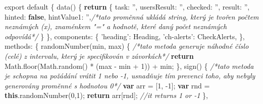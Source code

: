 \documentclass[
]{article}
\newenvironment{Shaded}{}{}
\newcommand{\AttributeTok}[1]{\textcolor[rgb]{0.49,0.56,0.16}{#1}}
\newcommand{\CommentTok}[1]{\textcolor[rgb]{0.38,0.63,0.69}{\textit{#1}}}
\newcommand{\ControlFlowTok}[1]{\textcolor[rgb]{0.00,0.44,0.13}{\textbf{#1}}}
\newcommand{\DataTypeTok}[1]{\textcolor[rgb]{0.56,0.13,0.00}{#1}}
\newcommand{\DecValTok}[1]{\textcolor[rgb]{0.25,0.63,0.44}{#1}}
\newcommand{\ImportTok}[1]{#1}
\newcommand{\KeywordTok}[1]{\textcolor[rgb]{0.00,0.44,0.13}{\textbf{#1}}}
\newcommand{\NormalTok}[1]{#1}
\newcommand{\OperatorTok}[1]{\textcolor[rgb]{0.40,0.40,0.40}{#1}}
\newcommand{\StringTok}[1]{\textcolor[rgb]{0.25,0.44,0.63}{#1}}
\newcommand{\VariableTok}[1]{\textcolor[rgb]{0.10,0.09,0.49}{#1}}
\begin{document}
\begin{Shaded}
\begin{Highlighting}[]
    \ImportTok{export} \ImportTok{default} \OperatorTok{\{}
        \AttributeTok{data}\NormalTok{() }\OperatorTok{\{}
            \ControlFlowTok{return} \OperatorTok{\{}
                \DataTypeTok{task}\OperatorTok{:} \StringTok{''}\OperatorTok{,}
                \DataTypeTok{usersResult}\OperatorTok{:} \StringTok{''}\OperatorTok{,}
                \DataTypeTok{checked}\OperatorTok{:} \StringTok{''}\OperatorTok{,}
                \DataTypeTok{result}\OperatorTok{:} \StringTok{''}\OperatorTok{,}
                \DataTypeTok{hinted}\OperatorTok{:} \KeywordTok{false}\OperatorTok{,}
                \DataTypeTok{hintValue1}\OperatorTok{:} \StringTok{''}\OperatorTok{,}\CommentTok{/*tato proměnná ukládá string, který je tvořen počtem }
\CommentTok{                neznámých (x), znaménkem "=" a hodnotě, které daný počet neznámých }
\CommentTok{                odpovídá*/}
            \OperatorTok{\}}
        \OperatorTok{\},} 
        \DataTypeTok{components}\OperatorTok{:} \OperatorTok{\{}
            \StringTok{'heading'}\OperatorTok{:}\NormalTok{ Heading}\OperatorTok{,}
            \StringTok{'ch-alerts'}\OperatorTok{:}\NormalTok{ CheckAlerts}\OperatorTok{,}
        \OperatorTok{\},}
        \DataTypeTok{methods}\OperatorTok{:} \OperatorTok{\{}
            \AttributeTok{randomNumber}\NormalTok{(min}\OperatorTok{,}\NormalTok{ max) }\OperatorTok{\{} \CommentTok{/*tato metoda generuje náhodné číslo (celé) }
\CommentTok{                z intervalu, který je specifikován v závorkách*/}
                \ControlFlowTok{return} \VariableTok{Math}\NormalTok{.}\AttributeTok{floor}\NormalTok{(}\VariableTok{Math}\NormalTok{.}\AttributeTok{random}\NormalTok{() }\OperatorTok{*}\NormalTok{ (max }\OperatorTok{-}\NormalTok{ min }\OperatorTok{+} \DecValTok{1}\NormalTok{)) }\OperatorTok{+}\NormalTok{ min}\OperatorTok{;}
            \OperatorTok{\},}
            \AttributeTok{sign}\NormalTok{() }\OperatorTok{\{} \CommentTok{/*tato metoda je schopna na požádání vrátit 1 nebo -1, usnadňuje tím }
\CommentTok{                        prevenci toho, aby nebyly generovány proměnné s hodnotou 0*/}
                \KeywordTok{var}\NormalTok{ arr }\OperatorTok{=}\NormalTok{ [}\DecValTok{1}\OperatorTok{,} \DecValTok{-1}\NormalTok{]}\OperatorTok{;}
                \KeywordTok{var}\NormalTok{ rnd }\OperatorTok{=} \KeywordTok{this}\NormalTok{.}\AttributeTok{randomNumber}\NormalTok{(}\DecValTok{0}\OperatorTok{,}\DecValTok{1}\NormalTok{)}\OperatorTok{;}
                \ControlFlowTok{return}\NormalTok{ arr[rnd]}\OperatorTok{;} \CommentTok{//it returns 1 or -1}
            \OperatorTok{\},}

\end{Highlighting}
\end{Shaded}
\end{document}
